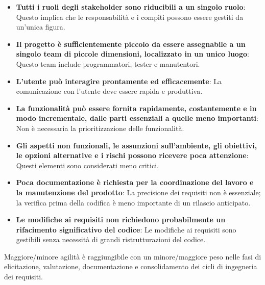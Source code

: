 \begin{itemize}
    \item \textbf{Tutti i ruoli degli stakeholder sono riducibili a un singolo
    ruolo}: Questo implica che le responsabilità e i compiti possono essere
    gestiti da un'unica figura.
    
    \item \textbf{Il progetto è sufficientemente piccolo da essere assegnabile
    a un singolo team di piccole dimensioni, localizzato in un unico luogo}:
    Questo team include programmatori, tester e manutentori.
    
    \item \textbf{L'utente può interagire prontamente ed efficacemente}: La
    comunicazione con l'utente deve essere rapida e produttiva.
    
    \item \textbf{La funzionalità può essere fornita rapidamente, costantemente
    e in modo incrementale, dalle parti essenziali a quelle meno importanti}: Non
    è necessaria la prioritizzazione delle funzionalità.
    
    \item \textbf{Gli aspetti non funzionali, le assunzioni sull'ambiente, gli
    obiettivi, le opzioni alternative e i rischi possono ricevere poca attenzione}:
    Questi elementi sono considerati meno critici.
    
    \item \textbf{Poca documentazione è richiesta per la coordinazione del lavoro
    e la manutenzione del prodotto}: La precisione dei requisiti non è essenziale;
    la verifica prima della codifica è meno importante di un rilascio anticipato.
    
    \item \textbf{Le modifiche ai requisiti non richiedono probabilmente un
    rifacimento significativo del codice}: Le modifiche ai requisiti sono
    gestibili senza necessità di grandi ristrutturazioni del codice.
\end{itemize}

\begin{tcolorbox}[colback=green!5!white,colframe=green!75!black]
    Maggiore/minore agilità è raggiungibile con un minore/maggiore peso
    nelle fasi di elicitazione, valutazione, documentazione e consolidamento dei
    cicli di ingegneria dei requisiti.
\end{tcolorbox}